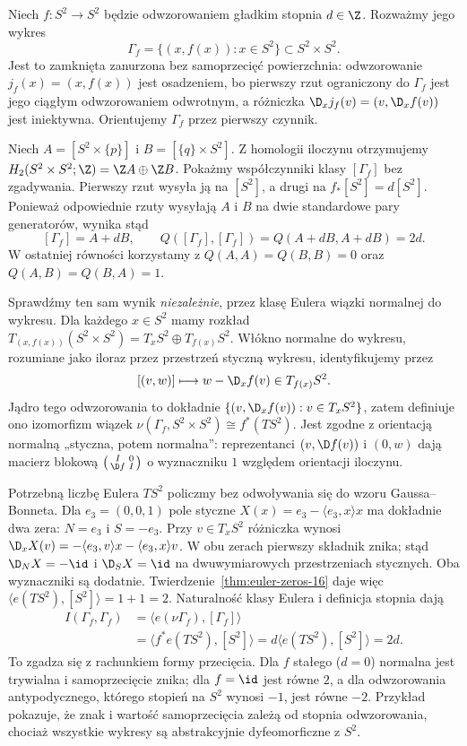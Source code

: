 \begin{przyklad}
\label{prz:samoprzeciecie-wykres-stopien-17}
Niech $f:S^2\to S^2$ będzie odwzorowaniem gładkim
stopnia $d\in\Z$. Rozważmy jego wykres
\[
 \Gamma_f=\{(x,f(x)):x\in S^2\}\subset S^2\times S^2.
\]
Jest to zamknięta zanurzona bez samoprzecięć powierzchnia:
odwzorowanie $j_f(x)=(x,f(x))$ jest osadzeniem,
bo pierwszy rzut ograniczony do $\Gamma_f$ jest jego
ciągłym odwzorowaniem odwrotnym, a różniczka
$\D_xj_f(v)=(v,\D_xf(v))$ jest iniektywna.
Orientujemy $\Gamma_f$ przez pierwszy czynnik.

Niech
$A=[S^2\times\{p\}]$ i
$B=[\{q\}\times S^2]$.
Z homologii iloczynu otrzymujemy
$H_2(S^2\times S^2;\Z)=\Z A\oplus\Z B$.
Pokażmy współczynniki klasy $[\Gamma_f]$ bez zgadywania.
Pierwszy rzut wysyła ją na $[S^2]$, a drugi na
$f_*[S^2]=d[S^2]$. Ponieważ odpowiednie rzuty wysyłają
$A$ i $B$ na dwie standardowe pary generatorów,
wynika stąd
\[
 [\Gamma_f]=A+dB,\qquad
 Q([\Gamma_f],[\Gamma_f])
 =Q(A+dB,A+dB)=2d.
\]
W ostatniej równości korzystamy z
$Q(A,A)=Q(B,B)=0$ oraz $Q(A,B)=Q(B,A)=1$.

Sprawdźmy ten sam wynik \emph{niezależnie}, przez klasę
Eulera wiązki normalnej do wykresu.
Dla każdego $x\in S^2$ mamy rozkład
$T_{(x,f(x))}(S^2\times S^2)=T_xS^2\oplus T_{f(x)}S^2$.
Włókno normalne do wykresu, rozumiane jako iloraz
przez przestrzeń styczną wykresu, identyfikujemy przez
\[
 [(v,w)]\longmapsto w-\D_xf(v)\in T_{f(x)}S^2.
\]
Jądro tego odwzorowania to dokładnie
$\{(v,\D_xf(v)):v\in T_xS^2\}$,
zatem definiuje ono izomorfizm wiązek
$\nu(\Gamma_f,S^2\times S^2)\cong f^*(TS^2)$.
Jest zgodne z orientacją normalną „styczna, potem normalna”:
reprezentanci $(v,\D f(v))$ i $(0,w)$ dają macierz
blokową $\left(\begin{smallmatrix}I&0\\\D f&I\end{smallmatrix}\right)$
o wyznaczniku $1$ względem orientacji iloczynu.

Potrzebną liczbę Eulera $TS^2$ policzmy bez odwoływania
się do wzoru Gaussa--Bonneta. Dla
$e_3=(0,0,1)$ pole styczne
$X(x)=e_3-\langle e_3,x\rangle x$
ma dokładnie dwa zera: $N=e_3$ i $S=-e_3$.
Przy $v\in T_xS^2$ różniczka wynosi
$\D_xX(v)=-\langle e_3,v\rangle x
-\langle e_3,x\rangle v$.
W obu zerach pierwszy składnik znika;
stąd $\D_NX=-\id$ i $\D_SX=\id$
na dwuwymiarowych przestrzeniach stycznych.
Oba wyznaczniki są dodatnie.
Twierdzenie~\ref{thm:euler-zeros-16} daje więc
$\langle e(TS^2),[S^2]\rangle=1+1=2$.
Naturalność klasy Eulera i definicja stopnia dają
\[
 \begin{aligned}
 I(\Gamma_f,\Gamma_f)
 &=\langle e(\nu\Gamma_f),[\Gamma_f]\rangle\\
 &=\langle f^*e(TS^2),[S^2]\rangle
 =d\langle e(TS^2),[S^2]\rangle=2d.
 \end{aligned}
\]
To zgadza się z rachunkiem formy przecięcia.
Dla $f$ stałego ($d=0$) normalna jest trywialna
i samoprzecięcie znika; dla $f=\id$ jest równe $2$,
a dla odwzorowania antypodycznego, którego stopień
na $S^2$ wynosi $-1$, jest równe $-2$.
Przykład pokazuje, że znak i wartość samoprzecięcia
zależą od stopnia odwzorowania, chociaż wszystkie
wykresy są abstrakcyjnie dyfeomorficzne z $S^2$.
\end{przyklad}

